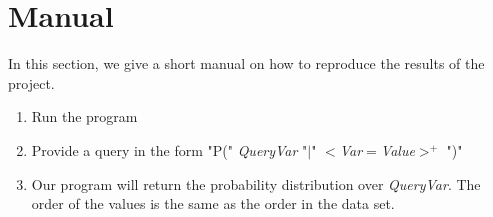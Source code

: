 \documentclass[10pt,a4paper]{article}
\begin{document}
\section{Manual}
In this section, we give a short manual on how to reproduce the results of the project. 
\begin{enumerate}
\item Run the program
\item Provide a query in the form "P(" \emph{QueryVar} "$|$" $<$\emph{Var}$=$\emph{Value}$>^+$ ")"
\item Our program will return the probability distribution over \emph{QueryVar}. The order of the values is the same as the order in the data set.
\end{enumerate}
\end{document}
